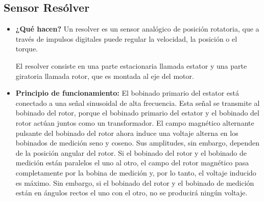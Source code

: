 \subsection*{Sensor Resólver}
\begin{itemize}
	\item \textbf{¿Qué hacen?} Un resolver es un sensor analógico de posición rotatoria, que a través de impulsos digitales puede regular la velocidad, la posición o el torque.
	
	El resolver consiste en una parte estacionaria llamada estator y una parte giratoria llamada rotor, que es montada al eje del motor. \cite{Servomotors_ResolverFeedback}
	
	\item \textbf{Principio de funcionamiento:} El bobinado primario del estator está conectado a una señal sinusoidal de alta frecuencia. Esta señal se transmite al bobinado del rotor, porque el bobinado primario del estator y el bobinado del rotor actúan juntos como un transformador. El campo magnético alternante pulsante del bobinado del rotor ahora induce una voltaje alterna en los bobinados de medición seno y coseno. Sus amplitudes, sin embargo, dependen de la posición angular del rotor.
	Si el bobinado del rotor y el bobinado de medición están paralelos el uno al otro, el campo del rotor magnético pasa completamente por la bobina de medición y, por lo tanto, el voltaje inducido es máximo.
	Sin embargo, si el bobinado del rotor y el bobinado de medición están en ángulos rectos el uno con el otro, no se producirá ningún voltaje.
	

\end{itemize}

